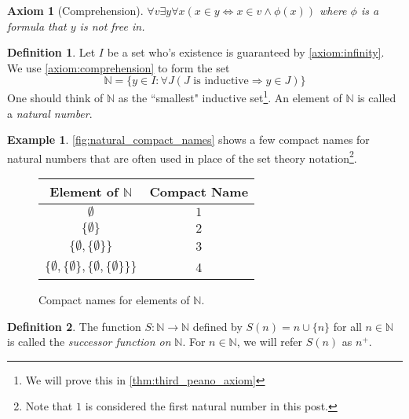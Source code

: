 \documentclass{article}
\theoremstyle{definition}
\newtheorem{definition}{Definition}[section]
\theoremstyle{definition}
\newtheorem{example}{Example}[section]
\theoremstyle{plain}
\theoremstyle{remark}
\theoremstyle{plain}
\theoremstyle{remark}
\theoremstyle{plain}
\theoremstyle{plain}
\theoremstyle{plain}
\newtheorem{axiom}{Axiom}[section]
\theoremstyle{plain}
\begin{document}
\begin{axiom}[Comprehension]
  \( 
    \forall v \exists y \forall x 
    (x \in y \Leftrightarrow x \in v \land \phi(x)) 
  \) 
  where 
  \( \phi \) is a formula that \( y \) is not free in.
  \label{axiom:comprehension}
\end{axiom}


\begin{definition}
  \label{def:natural_numbers}
  Let \( I \) be a set who's existence is guaranteed by 
  \autoref{axiom:infinity}. We use \autoref{axiom:comprehension} to form the set 
  \[ 
    \mathbb{N} 
    = 
    \{y \in I : \forall J ( J \text{ is inductive} \Rightarrow y \in J )\}
  \] 
  One should think of \( \mathbb{N} \) as the 
  ``smallest" inductive set\footnote{We will prove this in 
  \autoref{thm:third_peano_axiom}}. An 
  element of \( \mathbb{N} \) is called a \textit{natural number}.
\end{definition}

\begin{example}
  \label{example:compact_numbers}
  \autoref{fig:natural_compact_names} shows a few compact names for natural 
  numbers that are often used in place of the set theory 
  notation\footnote{Note that \( 1 \) is considered the first natural number in 
  this post.}.
\end{example}

\begin{figure}[h]
    \centering
    \begin{tabular}{ c | c }
      Element of \(\mathbb{N}\)  & Compact Name  \\
      \hline
      \(\emptyset\)                                                        & \(1\) \\
      \(\{\emptyset\}\)                                                    & \( 2 \) \\ 
      \(\{\emptyset, \{\emptyset\}\}\)                                     & \(3\) \\
      \(\{ \emptyset, \{\emptyset\}, \{\emptyset, \{ \emptyset \} \} \} \) & 4 
    \end{tabular} 
    \caption{Compact names for elements of \( \mathbb{N}\).}
    \label{fig:natural_compact_names}
\end{figure}

\begin{definition}
  The function \( S: \mathbb{N} \rightarrow \mathbb{N} \) defined by 
  \( S(n) = n \cup \{n\} \) for all \( n \in \mathbb{N} \) is called the 
  \textit{successor function on} \( \mathbb{N} \). For \( n \in \mathbb{N} \), 
  we will refer \( S(n) \) as \( n^{+} \).
\end{definition}
\end{document}
